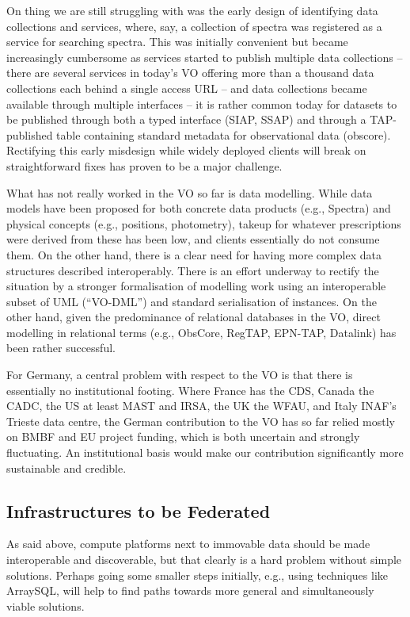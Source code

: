 On thing we are still struggling with was the early design of
identifying data collections and services, where, say, a collection of
spectra was registered as a service for searching spectra.  This was
initially convenient but became increasingly cumbersome as services
started to publish multiple data collections -- there are several
services in today's VO offering more than a thousand data collections
each behind a single access URL -- and data collections became available
through multiple interfaces -- it is rather common today for datasets
to be published through both a typed interface (SIAP, SSAP) and through
a TAP-published table containing standard metadata for observational data
(obscore).  Rectifying this early misdesign while widely deployed
clients will break on straightforward fixes has proven to be a major
challenge.

What has not really worked in the VO so far is data modelling.  While
data models have been proposed for both concrete data products (e.g.,
Spectra) and physical concepts (e.g., positions, photometry), takeup for
whatever prescriptions were derived from these has been low, and clients
essentially do not consume them.  On the other hand, there is a clear
need for having more complex data structures described interoperably.
There is an effort underway to rectify the situation by a stronger
formalisation of modelling work using an interoperable subset of UML
(``VO-DML'') and standard serialisation of instances.  On the other
hand, given the predominance of relational databases in the VO, direct
modelling in relational terms (e.g., ObsCore, RegTAP, EPN-TAP, Datalink)
has been rather successful.

For Germany, a central problem with respect to the VO is that there is
essentially no institutional footing.  Where France has the CDS, Canada
the CADC, the US at least MAST and IRSA, the UK the WFAU, and Italy
INAF's Trieste data centre, the German contribution to the VO has so far
relied mostly on BMBF and EU project funding, which is both uncertain
and strongly fluctuating.  An institutional basis would make our
contribution significantly more sustainable and credible.


\subsection{Infrastructures to be Federated}

As said above, compute platforms next to immovable data should be made
interoperable and discoverable, but that clearly is a hard problem without
simple solutions.  Perhaps going some smaller steps initially, e.g.,
using techniques like ArraySQL, will help to find paths towards more
general and simultaneously viable solutions.

